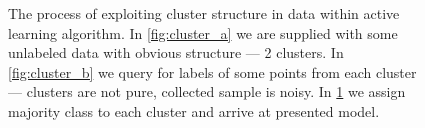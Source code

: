 \documentclass[12pt, a4paper, pdflatex, leqno]{report}
\begin{document}
\begin{figure}[htbp]
\begin{subfigure}[b]{0.3\textwidth}
    \caption{\label{fig:cluster_c}}
  \end{subfigure}
\begin{tiny}
\caption{The process of exploiting cluster structure in data within active learning algorithm. In \ref{fig:cluster_a} we are supplied with some unlabeled data with obvious structure --- 2 clusters. In \ref{fig:cluster_b} we query for labels of some points from each cluster --- clusters are not pure, collected sample is noisy. In \ref{fig:cluster_c} we assign majority class to each cluster and arrive at presented model.\label{fig:cluster}}
\end{tiny}
\vspace{1cm}
\end{figure}
\end{document}
